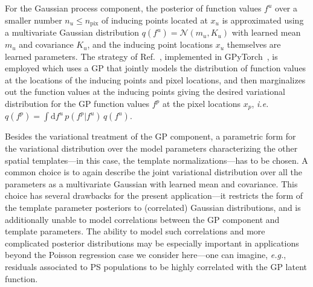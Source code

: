 \documentclass[]{article}
\begin{document}
For the Gaussian process component, the posterior of function values $f^u$ over a smaller number $n_u \leq n_\mathrm{pix}$ of inducing points located at $x_u$ is approximated using a multivariate Gaussian distribution $q(f^{u})=\mathcal N(m_u, K_u)$ with learned mean $m_u$ and covariance $K_u$, and the inducing point locations $x_u$ themselves are learned parameters. 
The strategy of Ref.~\cite{pmlr-v38-hensman15}, implemented in GPyTorch~\cite{gardner2018gpytorch}, is employed which uses a GP that jointly models the distribution of function values at the locations of the inducing points and pixel locations, and then marginalizes out the function values at the inducing points giving the desired variational distribution for the GP function values $f^{p}$ at the pixel locations $x_{p}$, \emph{i.e.} $q(f^{p}) = \int  \mathrm{d}f^{u}\, p(f^{p} | f^{u})\,q(f^{u})$.

Besides the variational treatment of the GP component, a parametric form for the variational distribution over the model parameters characterizing the other spatial templates---in this case, the template normalizations---has to be chosen. A common choice is to again describe the joint variational distribution over all the parameters as a multivariate Gaussian with learned mean and covariance. This choice has several drawbacks for the present application---it restricts the form of the template parameter posteriors to (correlated) Gaussian distributions, and is additionally unable to model correlations between the GP component and template parameters. The ability to model such correlations and more complicated posterior distributions may be especially important in applications beyond the Poisson regression case we consider here---one can imagine, \emph{e.g.}, residuals associated to PS populations to be highly correlated with the GP latent function.
\end{document}
